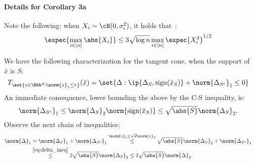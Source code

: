 \documentclass[a4paper]{article}
\begin{document}
\paragraph{Details for Corollary 3a}
Note the following: when $X_i \sim \cN(0, \sigma_i^2)$, it holds
that~\cite[Eq. (3.13)]{LedTal13}:
\begin{equation}
    \expec{\max_{i \in [n]} \abs{X_i}} \leq 3 \sqrt{\log n} \max_{i \in [n]}
    \expec{X_i^2}^{1/2}
    \label{eq:expected_sup_gaussian}
\end{equation}

We have the following characterization for the tangent cone, when the support of
$\bar{x}$ is $S$:
\[
    T_{\set{z \in \Rbb^d: \norm{z}_1 \leq r}}(\bar{x})
    = \set{\Delta: \ip{\Delta_S, \mathrm{sign}(\bar{x}_S)}
           + \norm{\Delta_{S^c}}_1 \leq 0}
\]
An immediate consequence, lower bounding the above by the C-S inequality, is:
\begin{equation}
    \norm{\Delta_{S^c}}_1 \leq \norm{\Delta_S}_2 \norm{\mathrm{sign}(\bar{x}_S)}
    \leq \sqrt{\abs{S}} \norm{\Delta_S}_2.
    \label{eq:delta_ineq}
\end{equation}
Observe the next chain of inequalities:
\begin{align*}
    \norm{\Delta}_1 &= \norm{\Delta_S}_1 + \norm{\Delta_{S^c}}_1
    \overset{\norm{z}_1 \leq \sqrt{d} \norm{z}_2}{\leq}
        \sqrt{\abs{S}} \norm{\Delta_S}_2 + \norm{\Delta_{S^c}}_1 \\
    &\overset{\eqref{eq:delta_ineq}}{\leq}
        2 \sqrt{\abs{S}} \norm{\Delta_S}_2 \leq 2 \sqrt{\abs{S}} \norm{\Delta}_2
\end{align*}



\end{document}
